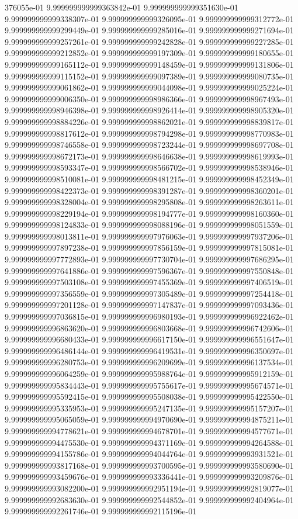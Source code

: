 376055e-01	9.999999999999363842e-01	9.999999999999351630e-01	9.999999999999338307e-01	9.999999999999326095e-01	9.999999999999312772e-01	9.999999999999299449e-01	9.999999999999285016e-01	9.999999999999271694e-01	9.999999999999257261e-01	9.999999999999242828e-01	9.999999999999227285e-01	9.999999999999212852e-01	9.999999999999197309e-01	9.999999999999180655e-01	9.999999999999165112e-01	9.999999999999148459e-01	9.999999999999131806e-01	9.999999999999115152e-01	9.999999999999097389e-01	9.999999999999080735e-01	9.999999999999061862e-01	9.999999999999044098e-01	9.999999999999025224e-01	9.999999999999006350e-01	9.999999999998986366e-01	9.999999999998967493e-01	9.999999999998946398e-01	9.999999999998926414e-01	9.999999999998905320e-01	9.999999999998884226e-01	9.999999999998862021e-01	9.999999999998839817e-01	9.999999999998817612e-01	9.999999999998794298e-01	9.999999999998770983e-01	9.999999999998746558e-01	9.999999999998723244e-01	9.999999999998697708e-01	9.999999999998672173e-01	9.999999999998646638e-01	9.999999999998619993e-01	9.999999999998593347e-01	9.999999999998566702e-01	9.999999999998538946e-01	9.999999999998510081e-01	9.999999999998481215e-01	9.999999999998452349e-01	9.999999999998422373e-01	9.999999999998391287e-01	9.999999999998360201e-01	9.999999999998328004e-01	9.999999999998295808e-01	9.999999999998263611e-01	9.999999999998229194e-01	9.999999999998194777e-01	9.999999999998160360e-01	9.999999999998124833e-01	9.999999999998088196e-01	9.999999999998051559e-01	9.999999999998013811e-01	9.999999999997976063e-01	9.999999999997937206e-01	9.999999999997897238e-01	9.999999999997856159e-01	9.999999999997815081e-01	9.999999999997772893e-01	9.999999999997730704e-01	9.999999999997686295e-01	9.999999999997641886e-01	9.999999999997596367e-01	9.999999999997550848e-01	9.999999999997503108e-01	9.999999999997455369e-01	9.999999999997406519e-01	9.999999999997356559e-01	9.999999999997305489e-01	9.999999999997254418e-01	9.999999999997201128e-01	9.999999999997147837e-01	9.999999999997093436e-01	9.999999999997036815e-01	9.999999999996980193e-01	9.999999999996922462e-01	9.999999999996863620e-01	9.999999999996803668e-01	9.999999999996742606e-01	9.999999999996680433e-01	9.999999999996617150e-01	9.999999999996551647e-01	9.999999999996486144e-01	9.999999999996419531e-01	9.999999999996350697e-01	9.999999999996280753e-01	9.999999999996209699e-01	9.999999999996137534e-01	9.999999999996064259e-01	9.999999999995988764e-01	9.999999999995912159e-01	9.999999999995834443e-01	9.999999999995755617e-01	9.999999999995674571e-01	9.999999999995592415e-01	9.999999999995508038e-01	9.999999999995422550e-01	9.999999999995335953e-01	9.999999999995247135e-01	9.999999999995157207e-01	9.999999999995065059e-01	9.999999999994970690e-01	9.999999999994875211e-01	9.999999999994778621e-01	9.999999999994678701e-01	9.999999999994577671e-01	9.999999999994475530e-01	9.999999999994371169e-01	9.999999999994264588e-01	9.999999999994155786e-01	9.999999999994044764e-01	9.999999999993931521e-01	9.999999999993817168e-01	9.999999999993700595e-01	9.999999999993580690e-01	9.999999999993459676e-01	9.999999999993336441e-01	9.999999999993209876e-01	9.999999999993082200e-01	9.999999999992951194e-01	9.999999999992819077e-01	9.999999999992683630e-01	9.999999999992544852e-01	9.999999999992404964e-01	9.999999999992261746e-01	9.999999999992115196e-01	